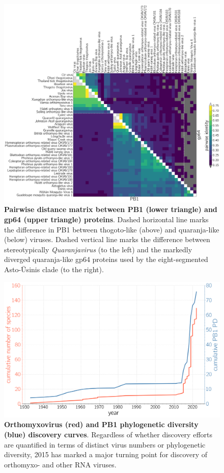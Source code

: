 \documentclass[11pt,twocolumn]{article}
\begin{document}
\begin{figure}
\centering
\includegraphics[width=\textwidth]{SuppFig6_idMatrix.png}
\caption{
\textbf{Pairwise distance matrix between PB1 (lower triangle) and gp64 (upper triangle) proteins}.
Dashed horizontal line marks the difference in PB1 between thogoto-like (above) and quaranja-like (below) viruses.
Dashed vertical line marks the difference between stereotypically \textit{Quaranjavirus} (to the left) and the markedly diverged quaranja-like gp64 proteins used by the eight-segmented Asto-\={U}sinis clade (to the right).
}
\end{figure}

\begin{figure}
\centering
\includegraphics[width=\textwidth]{SuppFig7_PD.png}
\caption{
\textbf{Orthomyxovirus (red) and PB1 phylogenetic diversity (blue) discovery curves}.
Regardless of whether discovery efforts are quantified in terms of distinct virus numbers or phylogenetic diversity, 2015 has marked a major turning point for discovery of orthomyxo- and other RNA viruses.
}
\end{figure}

% 
\end{document}
